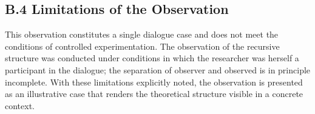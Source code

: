 \documentclass[12pt]{article}
\begin{document}
\subsection*{B.4 Limitations of the Observation}

This observation constitutes a single dialogue case and does not meet the conditions of controlled experimentation. The observation of the recursive structure was conducted under conditions in which the researcher was herself a participant in the dialogue; the separation of observer and observed is in principle incomplete. With these limitations explicitly noted, the observation is presented as an illustrative case that renders the theoretical structure visible in a concrete context.
\end{document}

